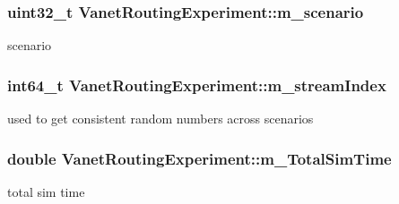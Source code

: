 \subsubsection[{\texorpdfstring{m\+\_\+scenario}{m_scenario}}]{\setlength{\rightskip}{0pt plus 5cm}uint32\+\_\+t Vanet\+Routing\+Experiment\+::m\+\_\+scenario\hspace{0.3cm}{\ttfamily [private]}}\hypertarget{classVanetRoutingExperiment_aeabf077a592421116de2b2df582471c8}{}\label{classVanetRoutingExperiment_aeabf077a592421116de2b2df582471c8}


scenario 

\subsubsection[{\texorpdfstring{m\+\_\+stream\+Index}{m_streamIndex}}]{\setlength{\rightskip}{0pt plus 5cm}int64\+\_\+t Vanet\+Routing\+Experiment\+::m\+\_\+stream\+Index\hspace{0.3cm}{\ttfamily [private]}}\hypertarget{classVanetRoutingExperiment_a3c86fdbcf9e422486ba1d75020a9c90e}{}\label{classVanetRoutingExperiment_a3c86fdbcf9e422486ba1d75020a9c90e}


used to get consistent random numbers across scenarios 

\subsubsection[{\texorpdfstring{m\+\_\+\+Total\+Sim\+Time}{m_TotalSimTime}}]{\setlength{\rightskip}{0pt plus 5cm}double Vanet\+Routing\+Experiment\+::m\+\_\+\+Total\+Sim\+Time\hspace{0.3cm}{\ttfamily [private]}}\hypertarget{classVanetRoutingExperiment_acae630bc30645931dcb68283b0217b1b}{}\label{classVanetRoutingExperiment_acae630bc30645931dcb68283b0217b1b}


total sim time 


